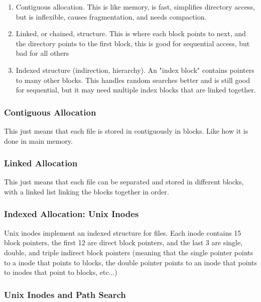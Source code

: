 \documentclass{article}
\begin{document}
\begin{enumerate}
    \item Contiguous allocation. This is like memory, is fast, simplifies directory access, but is inflexible, causes fragmentation, and needs compaction.

    \item Linked, or chained, structure. This is where each block points to next, and the directory points to the first block, this is good for sequential access, but bad for all others

    \item Indexed structure (indirection, hierarchy). An "index block" contains pointers to many other blocks. This handles random searches better and is still good for sequential, but it may need multiple index blocks that are linked together.
\end{enumerate}

\subsubsection{Contiguous Allocation}

This just means that each file is stored in contiguously in blocks. Like how it is done in main memory.

\subsubsection{Linked Allocation}

This just means that each file can be separated and stored in different blocks, with a linked list linking the blocks together in order.

\subsubsection{Indexed Allocation: Unix Inodes}

Unix inodes implement an indexed structure for files. Each inode contains 15 block pointers, the first 12 are direct block pointers, and the last 3 are single, double, and triple indirect block pointers (meaning that the single pointer points to a inode that points to blocks, the double pointer points to an inode that points to inodes that point to blocks, etc...)

\subsubsection{Unix Inodes and Path Search}
\end{document}
